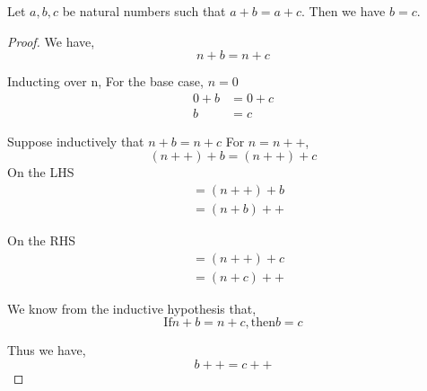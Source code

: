\documentclass[11pt]{report}
\begin{document}
\begin{prop}
Let $a,b,c$ be natural numbers such that $a+b=a+c$. Then we have $b=c$.
\end{prop}
\begin{proof}
We have,
$$n+b=n+c$$

Inducting over n,
For the base case, $n=0$
\begin{align*}
0 + b &= 0 + c \\
b &= c
\end{align*}

Suppose inductively that $n+b=n+c$
For $n=n++$,
$$(n++)+b=(n++)+c$$
On the LHS
\begin{align*}
&=(n++) + b \\
&=(n+b)++
\end{align*}

On the RHS
\begin{align*}
&=(n++) + c \\
&=(n+c)++
\end{align*}

We know from the inductive hypothesis that,
$$\text{If} n+b = n+c, \text{then} b = c$$

Thus we have,
$$b++ = c++$$
\end{proof}
\end{document}
